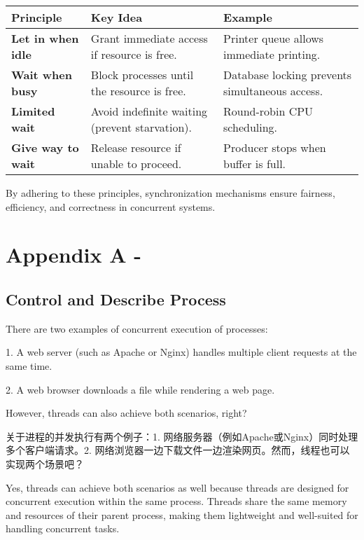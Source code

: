 \documentclass[a4paper]{book}
\begin{document}
\begin{tabular}{l|p{4cm}|p{7cm}}
\hline
\textbf{Principle} & \textbf{Key Idea} & \textbf{Example} \\
\hline
\textbf{Let in when idle} & Grant immediate access if resource is free. & Printer queue allows immediate printing. \\
\hline
\textbf{Wait when busy} & Block processes until the resource is free. & Database locking prevents simultaneous access. \\
\hline
\textbf{Limited wait} & Avoid indefinite waiting (prevent starvation). & Round-robin CPU scheduling. \\
\hline
\textbf{Give way to wait} & Release resource if unable to proceed. & Producer stops when buffer is full. \\
\hline
\end{tabular}

By adhering to these principles, synchronization mechanisms ensure fairness, efficiency, and correctness in concurrent systems.

\chapter{Appendix A - }

\section{Control and Describe Process}

\begin{greenbox}
There are two examples of concurrent execution of processes: 

1. A web server (such as Apache or Nginx) handles multiple client requests at the same time. 

2. A web browser downloads a file while rendering a web page. 

However, threads can also achieve both scenarios, right?
\end{greenbox}

关于进程的并发执行有两个例子：1. 网络服务器（例如Apache或Nginx）同时处理多个客户端请求。2. 网络浏览器一边下载文件一边渲染网页。然而，线程也可以实现两个场景吧？

Yes, threads can achieve both scenarios as well because threads are designed for concurrent execution within the same process. Threads share the same memory and resources of their parent process, making them lightweight and well-suited for handling concurrent tasks.
\end{document}
